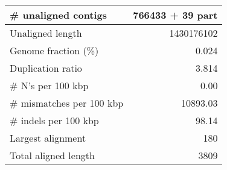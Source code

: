 \documentclass[12pt,a4paper]{article}
\begin{document}
\begin{table}[ht]
\begin{center}
\begin{tabular}{|l*{1}{|r}|}
\# unaligned contigs & 766433 + 39 part \\ \hline
Unaligned length & 1430176102 \\ \hline
Genome fraction (\%) & 0.024 \\ \hline
Duplication ratio & 3.814 \\ \hline
\# N's per 100 kbp & 0.00 \\ \hline
\# mismatches per 100 kbp & 10893.03 \\ \hline
\# indels per 100 kbp & 98.14 \\ \hline
Largest alignment & 180 \\ \hline
Total aligned length & 3809 \\ \hline
\end{tabular}
\end{center}
\end{table}
\end{document}
